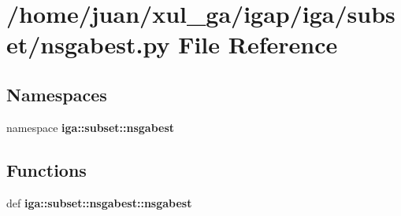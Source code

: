 \section{/home/juan/xul\_\-ga/igap/iga/subset/nsgabest.py File Reference}
\label{nsgabest_8py}
\subsection*{Namespaces}
\begin{CompactItemize}
\item 
namespace {\bf iga::subset::nsgabest}
\end{CompactItemize}
\subsection*{Functions}
\begin{CompactItemize}
\item 
def {\bf iga::subset::nsgabest::nsgabest}
\end{CompactItemize}
